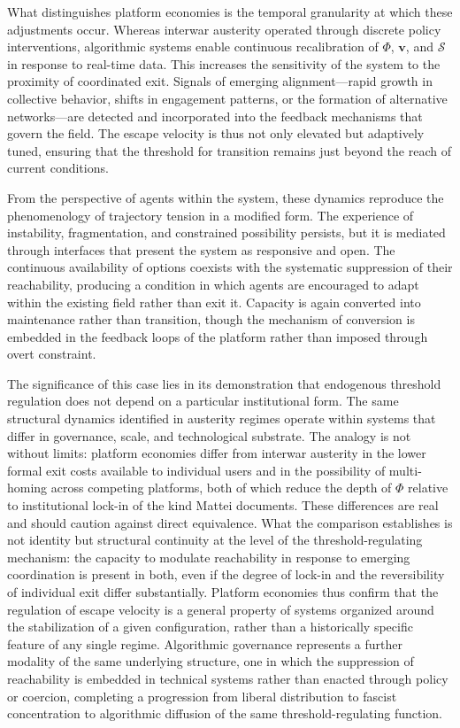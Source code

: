 \documentclass[11pt, a4paper]{article}
\begin{document}
What distinguishes platform economies is the temporal granularity at which these adjustments occur. Whereas interwar austerity operated through discrete policy interventions, algorithmic systems enable continuous recalibration of $\Phi$, $\mathbf{v}$, and $\mathcal{S}$ in response to real-time data. This increases the sensitivity of the system to the proximity of coordinated exit. Signals of emerging alignment---rapid growth in collective behavior, shifts in engagement patterns, or the formation of alternative networks---are detected and incorporated into the feedback mechanisms that govern the field. The escape velocity is thus not only elevated but adaptively tuned, ensuring that the threshold for transition remains just beyond the reach of current conditions.

From the perspective of agents within the system, these dynamics reproduce the phenomenology of trajectory tension in a modified form. The experience of instability, fragmentation, and constrained possibility persists, but it is mediated through interfaces that present the system as responsive and open. The continuous availability of options coexists with the systematic suppression of their reachability, producing a condition in which agents are encouraged to adapt within the existing field rather than exit it. Capacity is again converted into maintenance rather than transition, though the mechanism of conversion is embedded in the feedback loops of the platform rather than imposed through overt constraint.

The significance of this case lies in its demonstration that endogenous threshold regulation does not depend on a particular institutional form. The same structural dynamics identified in austerity regimes operate within systems that differ in governance, scale, and technological substrate. The analogy is not without limits: platform economies differ from interwar austerity in the lower formal exit costs available to individual users and in the possibility of multi-homing across competing platforms, both of which reduce the depth of $\Phi$ relative to institutional lock-in of the kind Mattei documents. These differences are real and should caution against direct equivalence. What the comparison establishes is not identity but structural continuity at the level of the threshold-regulating mechanism: the capacity to modulate reachability in response to emerging coordination is present in both, even if the degree of lock-in and the reversibility of individual exit differ substantially. Platform economies thus confirm that the regulation of escape velocity is a general property of systems organized around the stabilization of a given configuration, rather than a historically specific feature of any single regime. Algorithmic governance represents a further modality of the same underlying structure, one in which the suppression of reachability is embedded in technical systems rather than enacted through policy or coercion, completing a progression from liberal distribution to fascist concentration to algorithmic diffusion of the same threshold-regulating function.
\end{document}
